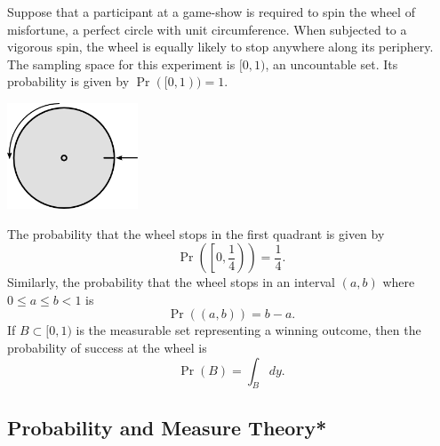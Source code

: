 \begin{example}
Suppose that a participant at a game-show is required to spin the wheel of misfortune, a perfect circle with unit circumference.
When subjected to a vigorous spin, the wheel is equally likely to stop anywhere along its periphery.
The sampling space for this experiment is $[0, 1)$, an uncountable set.
Its probability is given by $\Pr ([0, 1)) = 1$.

\begin{center}
\includegraphics[height=3.15cm]{Figures/2Chapter/wheel}
\end{center}

The probability that the wheel stops in the first quadrant is given by
\begin{equation*}
\Pr \left( \left[ 0, \frac{1}{4} \right) \right) = \frac{1}{4}.
\end{equation*}
Similarly, the probability that the wheel stops in an interval $(a, b)$ where $0 \leq a \leq b < 1$ is
\begin{equation*}
\Pr ((a,b)) = b - a.
\end{equation*}
If $B \subset [0, 1)$ is the measurable set representing a winning outcome, then the probability of success at the wheel is
\begin{equation*}
\Pr(B) = \int_B dy .
\end{equation*}
\end{example}


\subsection{Probability and Measure Theory*}

